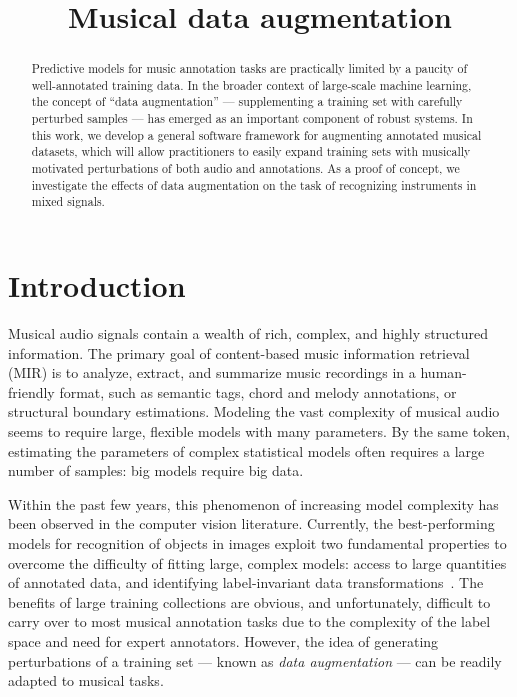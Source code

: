 \documentclass{article}
\title{Musical data augmentation}
\begin{document}
%
\maketitle
%
\begin{abstract}
Predictive models for music annotation tasks are practically limited by a paucity of
well-annotated training data.
In the broader context of large-scale machine learning, the concept of ``data
augmentation'' --- supplementing a training set with carefully perturbed samples ---
has emerged as an important component of robust systems.
In this work, we develop a general software framework for augmenting annotated
musical datasets, which will allow practitioners to easily expand training sets
with musically motivated perturbations of both audio and annotations.
As a proof of concept, we investigate the effects of data augmentation on
the task of recognizing instruments in mixed signals.
\end{abstract}
%
\section{Introduction}
\label{sec:introduction}


Musical audio signals contain a wealth of rich, complex, and highly structured
information.  The primary goal of content-based music information retrieval (MIR) is to
analyze, extract, and summarize music recordings in a human-friendly
format, such as semantic tags, chord and melody annotations, or structural boundary
estimations.  Modeling the vast complexity of musical audio seems to require large, 
flexible models with many parameters.
By the same token, estimating the parameters of complex statistical models often requires
a large number of samples: big models require big data.

Within the past few years, this phenomenon of increasing model complexity has been 
observed in the computer vision literature.  Currently, the best-performing models for 
recognition of objects in images exploit two fundamental properties to overcome the 
difficulty of fitting large, complex models: access to large quantities of annotated data, 
and identifying label-invariant data transformations~\cite{krizhevsky2012imagenet}.
The benefits of large training collections are obvious, and unfortunately, difficult to
carry over to most musical annotation tasks due to the complexity of the label space and
need for expert annotators.  However, the idea of generating perturbations of a training
set --- known as \emph{data augmentation} --- can be readily adapted to musical tasks.
\end{document}

